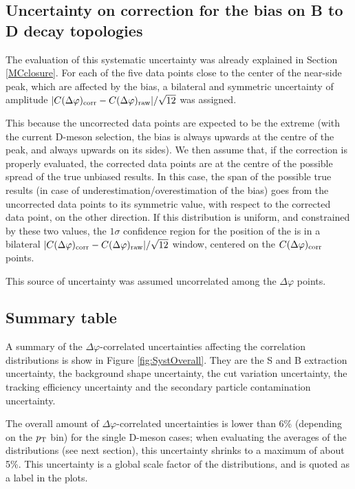 \subsection{Uncertainty on correction for the bias on B to D decay topologies}
The evaluation of this systematic uncertainty was already explained in Section \ref{MCclosure}. For each of the five data points close to the center of the near-side peak, which are affected by the bias, a bilateral and symmetric uncertainty of amplitude $|C(\Delta\varphi)_{\rm corr} - C(\Delta\varphi)_{\rm raw}|/\sqrt{12}$ was assigned.

This because the uncorrected data points are expected to be the extreme (with the current D-meson selection, the bias is always upwards at the centre of the peak, and always upwards on its sides). We then assume that, if the correction is properly evaluated, the corrected data points are at the centre of the possible spread of the true unbiased results. In this case, the span of the possible true results (in case of underestimation/overestimation of the bias) goes from the uncorrected data points to its symmetric value, with respect to the corrected data point, on the other direction. If this distribution is uniform, and constrained by these two values, the $1\sigma$ confidence region for the position of the is in a bilateral $|C(\Delta\varphi)_{\rm corr} - C(\Delta\varphi)_{\rm raw}|/\sqrt{12}$ window, centered on the $C(\Delta\varphi)_{\rm corr}$ points.

This source of uncertainty was assumed uncorrelated among the $\Delta\varphi$ points.

\subsection{Summary table}
A summary of the $\Delta\varphi$-correlated uncertainties affecting the correlation distributions is show in Figure \ref{fig:SystOverall}. They are the S and B extraction uncertainty, the background shape uncertainty, the cut variation uncertainty, the tracking efficiency uncertainty and the secondary particle contamination uncertainty.

The overall amount of $\Delta\varphi$-correlated uncertainties is lower than 6\% (depending on the $p_{\rm T}$ bin) for the single D-meson cases; when evaluating the averages of the distributions (see next section), this uncertainty shrinks to a maximum of about 5\%. This uncertainty is a global scale factor of the distributions, and is quoted as a label in the plots.

